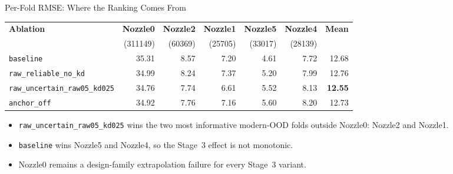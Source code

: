 \documentclass[UTF8,aspectratio=169]{ctexbeamer}
\newcommand{\good}[1]{\textcolor{green!45!black}{#1}}
\begin{document}
\begin{frame}{Per-Fold RMSE: Where the Ranking Comes From}
\footnotesize
\begin{center}
\renewcommand{\arraystretch}{1.08}
\setlength{\tabcolsep}{4pt}
\begin{tabular}{@{}lrrrrr|r@{}}
\toprule
\textbf{Ablation} &
\textbf{Nozzle0} & \textbf{Nozzle2} & \textbf{Nozzle1} & \textbf{Nozzle5} & \textbf{Nozzle4} &
\textbf{Mean} \\
& \scriptsize(311149) & \scriptsize(60369) & \scriptsize(25705) & \scriptsize(33017) & \scriptsize(28139) & \\
\midrule
\texttt{baseline} & 35.31 & 8.57 & 7.20 & \good{4.61} & \good{7.72} & 12.68 \\
\texttt{raw\_reliable\_no\_kd} & 34.99 & 8.24 & 7.37 & 5.20 & 7.99 & 12.76 \\
\rowcolor{winrow}
\texttt{raw\_uncertain\_raw05\_kd025} & 34.76 & \good{7.74} & \good{6.61} & 5.52 & 8.13 & \textbf{12.55} \\
\rowcolor{softrow}
\texttt{anchor\_off} & 34.92 & 7.76 & 7.16 & 5.60 & 8.20 & 12.73 \\
\bottomrule
\end{tabular}
\end{center}

\vspace{0.4em}
\small
\begin{itemize}\setlength\itemsep{2pt}
  \item \texttt{raw\_uncertain\_raw05\_kd025} wins the two most informative modern-OOD folds
        outside Nozzle0: Nozzle2 and Nozzle1.
  \item \texttt{baseline} wins Nozzle5 and Nozzle4, so the Stage~3 effect is not monotonic.
  \item Nozzle0 remains a design-family extrapolation failure for every Stage~3 variant.
\end{itemize}
\end{frame}
\end{document}
